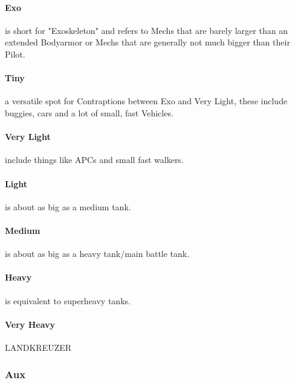         \paragraph{Exo} is short for "Exoskeleton" and refers to Mechs that are barely larger than an extended Bodyarmor
        or Mechs that are generally not much bigger than their Pilot.
        \paragraph{Tiny} a versatile spot for Contraptions between Exo and Very Light, these include buggies, cars and
        a lot of small, fast Vehicles.
        \paragraph{Very Light} include things like APCs and small fast walkers.
        \paragraph{Light} is about as big as a medium tank.
        \paragraph{Medium} is about as big as a heavy tank/main battle tank.
        \paragraph{Heavy} is equivalent to superheavy tanks.
        \paragraph{Very Heavy} LANDKREUZER
    \subsubsection{Aux}
